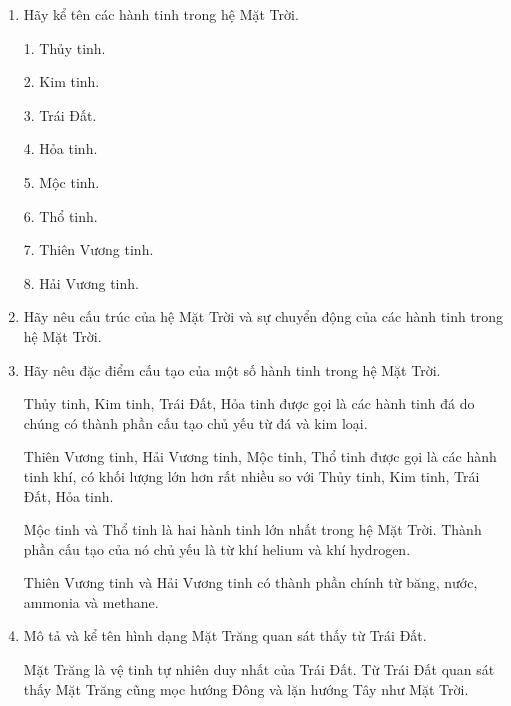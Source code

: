 \begin{enumerate}[label=\bfseries Câu \arabic*:]
	\item {}
	
	
	{
		Hãy kể tên các hành tinh trong hệ Mặt Trời.
	}
	
	\hideall
	{
		1. Thủy tinh.
		
		2. Kim tinh.
		
		3. Trái Đất.
		
		4. Hỏa tinh.
		
		5. Mộc tinh.
		
		6. Thổ tinh.
		
		7. Thiên Vương tinh.
		
		8. Hải Vương tinh.
	}
	\item {}
	
	{
		Hãy nêu cấu trúc của hệ Mặt Trời và sự chuyển động của các hành tinh trong hệ Mặt Trời.
	}
	
	
	\item {}
	
	
	{
		Hãy nêu đặc điểm cấu tạo của một số hành tinh trong hệ Mặt Trời.
	}
	
	\hideall
	{
		Thủy tinh, Kim tinh, Trái Đất, Hỏa tinh được gọi là các hành tinh đá do chúng có thành phần cấu tạo chủ yếu từ đá và kim loại.
		
		Thiên Vương tinh, Hải Vương tinh, Mộc tinh, Thổ tinh được gọi là các hành tinh khí, có khối lượng lớn hơn rất nhiều so với Thủy tinh, Kim tinh, Trái Đất, Hỏa tinh.
		
		Mộc tinh và Thổ tinh là hai hành tinh lớn nhất trong hệ Mặt Trời. Thành phần cấu tạo của nó chủ yếu là từ khí helium và khí hydrogen.
		
		Thiên Vương tinh và Hải Vương tinh có thành phần chính từ băng, nước, ammonia và methane.
	}
	\item {}
	

	{
		Mô tả và kể tên hình dạng Mặt Trăng quan sát thấy từ Trái Đất.
	}
	
	\hideall
	{
		Mặt Trăng là vệ tinh tự nhiên duy nhất của Trái Đất. Từ Trái Đất quan sát thấy Mặt Trăng cũng mọc hướng Đông và lặn hướng Tây như Mặt Trời.
		
}
\end{enumerate}
